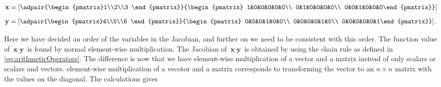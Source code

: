 \begin{multicols}{2}
    \noindent
    \begin{align*}
        \textbf{x} = \left[\adpair{\begin{pmatrix}1\\2\\3
        \end{pmatrix}}{\begin{pmatrix}
        1&0&0&0&0&0\\
        0&1&0&0&0&0\\
        0&0&1&0&0&0\end{pmatrix}} \right]
    \end{align*}
    \begin{align*}
        \textbf{y} = \left[\adpair{\begin{pmatrix}4\\5\\6
        \end{pmatrix}}{\begin{pmatrix}
        0&0&0&1&0&0\\
        0&0&0&0&1&0\\
        0&0&0&0&0&1\end{pmatrix}} \right].
    \end{align*}
\end{multicols}
Here we have decided an order of the variables in the Jacobian, and further on we need to be consistent with this order. The function value of $\textbf{x}\cdot\textbf{y}$ is found by normal element-wise multiplication. The Jacobian of $\textbf{x}\cdot\textbf{y}$ is obtained by using the chain rule as defined in \eqref{eq:arithmeticOperators}. The difference is now that we have element-wise multiplication of a vector and a matrix instead of only scalars or scalars and vectors. element-wise multiplication of a vecotor and a matrix corresponds to transforming the vector to an $n\times n$ matrix with the values on the diagonal. The calculations gives
